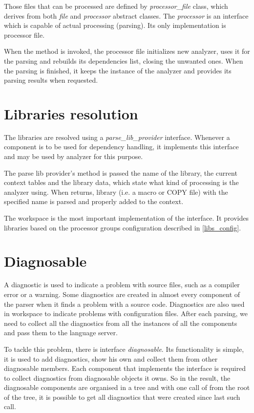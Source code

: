 Those files that can be processed are defined by \emph{processor\_file} class, which derives from both \emph{file} and \emph{processor} abstract classes. The \emph{processor} is an interface which is capable of actual processing (parsing). Its only implementation is processor file.

When the  method is invoked, the processor file initializes new analyzer, uses it for the parsing and rebuilds its dependencies list, closing the unwanted ones. When the parsing is finished, it keeps the instance of the analyzer and provides its parsing results when requested.


\section{Libraries resolution}

The libraries are resolved using a \emph{parse\_lib\_provider} interface. Whenever a component is to be used for dependency handling, it implements this interface and may be used by analyzer for this purpose.

The parse lib provider's  method is passed the name of the library, the current context tables and the library data, which state what kind of processing is the analyzer using. When  returns, library (i.e. a macro or COPY file) with the specified name is parsed and properly added to the context.

The workspace is the most important implementation of the  interface. It provides libraries based on the processor groups configuration described in \cref{libs_config}.

\section{Diagnosable}
A diagnostic is used to indicate a problem with source files, such as a compiler error or a warning. Some diagnostics are created in almost every component of the parser when it finds a problem with a source code. Diagnostics are also used in workspace to indicate problems with configuration files. After each parsing, we need to collect all the diagnostics from all the instances of all the components and pass them to the language server.

To tackle this problem, there is interface \emph{diagnosable}. Its functionality is simple, it is used to add diagnostics, show his own and collect them from other diagnosable members. Each component that implements the interface is required to collect diagnostics from diagnosable objects it owns. So in the result, the diagnosable components are organised in a tree and with one call of  from the root of the tree, it is possible to get all diagnostics that were created since last such call.

